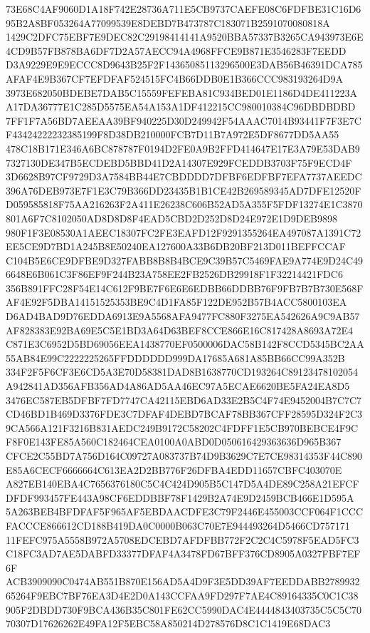 \documentclass[UTF8,fontset=fandol,zihao=-4,a4paper]{ctexart}
\begin{document}
{{73E68C4AF9060D1A18F742E28736A711E5CB9737CAEFE08C6FDFBE31C16D695B2A8BF053264A77099539E8DEBD7B473787C183071B2591070080818A
1429C2DFC75EBF7E9DEC82C29198414141A9520BBA57337B3265CA943973E6E4CD9B57FB878BA6DF7D2A57AECC94A4968FFCE9B871E3546283F7EEDD
D3A9229E9E9ECCC8D9643B25F2F14365085113296500E3DAB56B46391DCA785AFAF4E9B367CF7EFDFAF524515FC4B66DDB0E1B366CCC983193264D9A
3973E682050BDEBE7DAB5C15559FEFEBA81C934BED01E1186D4DE411223AA17DA36777E1C285D5575EA54A153A1DF412215CC980010384C96DBDBDBD
7FF1F7A56BD7AEEAA39BF940225D30D249942F54AAAC7014B93441F7F3E7CF43424222232385199F8D38DB210000FCB7D11B7A972E5DF8677DD5AA55
478C18B171E346A6BC878787F0194D2FE0A9B2FFD414647E17E3A79E53DAB97327130DE347B5ECDEBD5BBD41D2A14307E929FCEDDB3703F75F9ECD4F
3D6628B97CF9729D3A7584BB44E7CBDDDD7DFBF6EDFBF7EFA7737AEEDC396A76DEB973E7F1E3C79B366DD23435B1B1CE42B269589345AD7DFE12520F
D059585818F75AA216263F2A411E26238C606B52AD5A355F5FDF13274E1C3870801A6F7C8102050AD8D8D8F4EAD5CBD2D252D8D24E972E1D9DEB9898
980F1F3E08530A1AEEC18307FC2FE3EAFD12F9291355264EA497087A1391C72EE5CE9D7BD1A245B8E50240EA127600A33B6DB20BF213D011BEFFCCAF
C104B5E6CE9DFBE9D327FABB8B8B4BCE9C39B57C5469FAE9A774E9D24C496648E6B061C3F86EF9F244B23A758EE2FB2526DB29918F1F32214421FDC6
356B891FFC28F54E14C612F9BE7F6E6E6EDBB66DDBB76F9FB7B7B730E568FAF4E92F5DBA14151525353BE9C4D1FA85F122DE952B57B4ACC5800103EA
D6AD4BAD9D76EDDA6913E9A5568AFA9477FC880F3275EA542626A9C9AB57AF828383E92BA69E5C5E1BD3A64D63BEF8CCE866E16C817428A8693A72E4
C871E3C6952D5BD69056EEA1438770EF0500006DAC58B142F8CCD5345BC2AA55AB84E99C2222225265FFDDDDDD999DA17685A681A85BB66CC99A352B
334F2F5F6CF3E6CD5A3E70D58381DAD8B1638770CD193264C89123478102054A942841AD356AFB356AD4A86AD5AA46EC97A5ECAE6620BE5FA24EA8D5
3476EC587EB5DFBF7FD7747CA42115EBD6AD33E2B5C4F74E9452004B7C7C7CD46BD1B469D3376FDE3C7DFAF4DEBD7BCAF78BB367CFF28595D324F2C3
9CA566A121F3216B831AEDC249B9172C58202C4FDFF1E5CB970BEBCE4F9CF8F0E143FE85A560C182464CEA0100A0ABD0D050616429363636D965B367
CFCE2C55BD7A756D164C09727A083737B74D9B3629C7E7CE98314353F44C890E85A6CECF6666664C613EA2D2BB776F26DFBA4EDD11657CBFC403070E
A827EB140EBA4C7656376180C5C4C424D905B5C147D5A4DE89C258A21EFCFDFDF993457FE443A98CF6EDDBBF78F1429B2A74E9D2459BCB466E1D595A
5A263BEB4BFDFAF5F965AF5EBDAACDFE3C79F2446E455003CCF064F1CCCFACCCE866612CD188B419DA0C0000B063C70E7E944493264D5466CD757171
11FEFC975A5558B972A5708EDCEBD7AFDFBB772F2C2C4C5978F5EAD5FC3C18FC3AD7AE5DABFD33377DFAF4A3478FD67BFF376CD8905A0327FBF7EF6F
ACB3909090C0474AB551B870E156AD5A4D9F3E5DD39AF7EEDDABB278993265264F9EBC7BF76EA3D4E2D0A143CCFAA9FD297F7AE4C89164335C0C1C38
905F2DBDD730F9BCA436B35C801FE62CC5990DAC4E4444843403735C5C5C7070307D17626262E49FA12F5EBC58A850214D278576D8C1C1419E68DAC3
}}
\end{document}
